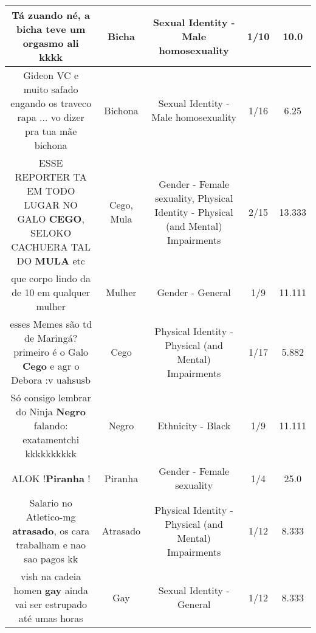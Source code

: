 \documentclass[11pt]{article}
\newlength\mylength
\begin{document}
\begin{center}
\begin{longtable}{|C{.65\mylength}|C{.30\mylength}|C{.12\mylength}|C{.12\mylength}|C{.12\mylength}|}
  \small Tá zuando né, a \textbf{bicha} teve um orgasmo ali kkkk\normalsize   & Bicha & Sexual Identity - Male homosexuality & 1/10 & 10.0 \\  \hline
  \small Gideon VC e muito safado engando os traveco rapa ... vo dizer pra tua mãe bichona\normalsize   & Bichona & Sexual Identity - Male homosexuality & 1/16 & 6.25 \\  \hline
  \small ESSE REPORTER TA EM TODO LUGAR NO GALO \textbf{CEGO}, SELOKO CACHUERA TAL DO \textbf{MULA} etc\normalsize   & Cego, Mula & Gender - Female sexuality, Physical Identity - Physical (and Mental) Impairments & 2/15 & 13.333 \\  \hline
  \small que corpo lindo da de 10 em qualquer mulher\normalsize   & Mulher & Gender - General & 1/9 & 11.111 \\  \hline
  \small esses Memes são td de Maringá?primeiro é o Galo \textbf{Cego} e agr o Debora  :v uahsusb\normalsize   & Cego & Physical Identity - Physical (and Mental) Impairments & 1/17 & 5.882 \\  \hline
  \small Só consigo lembrar do Ninja \textbf{Negro} falando: exatamentchi kkkkkkkkkk\normalsize   & Negro & Ethnicity - Black & 1/9 & 11.111 \\  \hline
  \small ALOK !\textbf{Piranha} !\normalsize   & Piranha & Gender - Female sexuality & 1/4 & 25.0 \\  \hline
  \small Salario no Atletico-mg \textbf{atrasado}, os cara trabalham e nao sao pagos kk\normalsize   & Atrasado & Physical Identity - Physical (and Mental) Impairments & 1/12 & 8.333 \\  \hline
  \small vish na cadeia homen \textbf{gay} ainda vai ser estrupado até  umas horas\normalsize   & Gay & Sexual Identity - General & 1/12 & 8.333 \\  \hline

\end{longtable}
\end{center}
\end{document}
